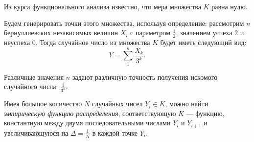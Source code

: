 \documentclass[12pt, a4paper]{article}
\begin{document}
Из курса функционального анализа \cite{Kolmogorov_Fomin} известно, что мера множества $K$ равна нулю.

Будем генерировать точки этого множества, используя определение: рассмотрим $n$ бернуллиевских независимых величин $X_i$ с параметром $\frac 12$, значением успеха $2$ и неуспеха $0$. Тогда случайное число из множества $K$ будет иметь следующий вид:
\[ Y = \sum\limits_1^n \frac{X_k}{3^k}. \]

Различные значения $n$ задают различную точность получения искомого случайного числа: $\frac{1}{3^{n}}$.

Имея большое количество $N$ случайных чисел $Y_i \in K$, можно найти \textit{эмпирическую функцию распределения}, соответствующую $K$ --- функцию, константную между двумя последовательными числами $Y_i$ и $Y_{i+1}$ и увеличивающуюся на $\Delta = \frac 1N$ в каждой точке $Y_i$.
\end{document}

